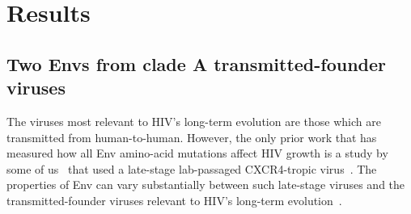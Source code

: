 \documentclass[9pt]{elife}
\begin{document}
\section{Results}

\subsection{Two Envs from clade A transmitted-founder viruses}
The viruses most relevant to HIV's long-term evolution are those which are transmitted from human-to-human.
However, the only prior work that has measured how all Env amino-acid mutations affect HIV growth is a study by some of us~\citep{haddox2016experimental} that used a late-stage lab-passaged CXCR4-tropic virus~\citep[LAI;][]{peden1991changes}.
The properties of Env can vary substantially between such late-stage viruses and the transmitted-founder viruses relevant to HIV's long-term evolution~\citep{sagar2006human,wilen2011phenotypic,parrish2013phenotypic,ronen2015hiv}.
\end{document}
